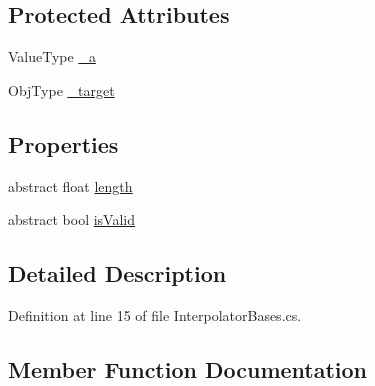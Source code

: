 \subsection*{Protected Attributes}
\begin{DoxyCompactItemize}
\item 
Value\+Type \mbox{\hyperlink{class_leap_1_1_unity_1_1_animation_1_1_internal_1_1_interpolator_base_a069c41bcb782aeca583914e41e640190}{\+\_\+a}}
\item 
Obj\+Type \mbox{\hyperlink{class_leap_1_1_unity_1_1_animation_1_1_internal_1_1_interpolator_base_a478ea3e92e103e2afb134120862fb1d1}{\+\_\+target}}
\end{DoxyCompactItemize}
\subsection*{Properties}
\begin{DoxyCompactItemize}
\item 
abstract float \mbox{\hyperlink{class_leap_1_1_unity_1_1_animation_1_1_internal_1_1_interpolator_base_ab65defbf437d15a02f3ae11b99035126}{length}}
\item 
abstract bool \mbox{\hyperlink{class_leap_1_1_unity_1_1_animation_1_1_internal_1_1_interpolator_base_a3e3930beb1639015924c320546935f7b}{is\+Valid}}
\end{DoxyCompactItemize}


\subsection{Detailed Description}


Definition at line 15 of file Interpolator\+Bases.\+cs.



\subsection{Member Function Documentation}
\mbox{\label{class_leap_1_1_unity_1_1_animation_1_1_internal_1_1_interpolator_base_a8949a18bfa04b24b04e6c24980f48e55}} 
